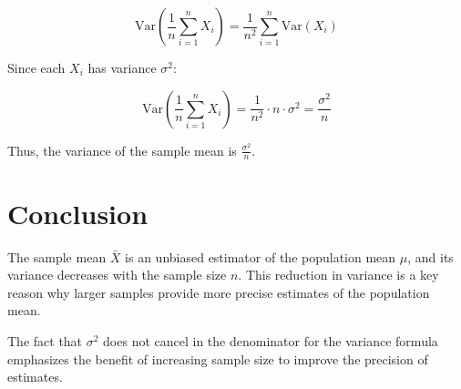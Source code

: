 \documentclass{article}
\begin{document}
\[
\text{Var} \left( \frac{1}{n} \sum_{i=1}^{n} X_i \right) = \frac{1}{n^2} \sum_{i=1}^{n} \text{Var}(X_i)
\]

Since each \(X_i\) has variance \(\sigma^2\):

\[
\text{Var} \left( \frac{1}{n} \sum_{i=1}^{n} X_i \right) = \frac{1}{n^2} \cdot n \cdot \sigma^2 = \frac{\sigma^2}{n}
\]

Thus, the variance of the sample mean is \(\frac{\sigma^2}{n}\).

\section{Conclusion}
The sample mean \(\bar{X}\) is an unbiased estimator of the population mean \( \mu \), and its variance decreases with the sample size \( n \). This reduction in variance is a key reason why larger samples provide more precise estimates of the population mean. 

The fact that \(\sigma^2\) does not cancel in the denominator for the variance formula emphasizes the benefit of increasing sample size to improve the precision of estimates.
\end{document}

